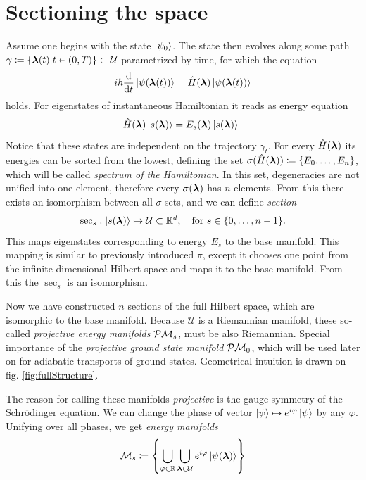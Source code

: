 \section{Sectioning the space}
Assume one begins with the state $\ket{\psi_0}$. The state then evolves along some path $\gamma\coloneqq\{{\bm\lambda}(t)|t\in(0,T)\}\subset \mathcal U$ parametrized by time, for which the \Schrodinger equation
\begin{equation}
    i\hbar \frac{\mathrm{d} }{\mathrm{d} t}\ket{\psi({\bm\lambda}(t))} = \hat{H}({\bm\lambda})\ket{\psi({\bm\lambda}(t))}
    \label{eq:schrodinger}
\end{equation}
holds. For eigenstates of instantaneous Hamiltonian it reads as energy \Schrodinger equation
\begin{equation}
    \hat{H}({\bm\lambda})\ket{s({\bm\lambda})}=E_s({\bm\lambda})\ket{s({\bm\lambda})}.
    \label{eq:energySchrodinger}
\end{equation}
Notice that these states are independent on the trajectory $\gamma_t$.
For every $\hat{H}({\bm\lambda})$ its energies can be sorted from the lowest, defining the set $\sigma(\hat{H}({\bm\lambda}))\coloneqq\{E_0,\dots,E_n\}$, which will be called \emph{spectrum of the Hamiltonian}. In this set, degeneracies are not unified into one element, therefore every $\sigma({\bm\lambda})$ has $n$ elements. From this there exists an isomorphism between all $\sigma$-sets, and we can define \emph{section} 
$$\mathrm{sec}_s: \ket{s({\bm\lambda})}\mapsto \mathcal{U}\subset \mathbb{R}^d, \quad \text{for } s\in\{0,\dots, n-1\}.$$
This maps eigenstates corresponding to energy $E_s$ to the base manifold. This mapping is similar to previously introduced $\pi$, except it chooses one point from the infinite dimensional Hilbert space and maps it to the base manifold. From this the $\sec_s$ is an isomorphism. 

Now we have constructed $n$ sections of the full Hilbert space, which are isomorphic to the base manifold. Because $\mathcal U$ is a Riemannian manifold, these so-called \emph{projective energy manifolds} $\mathcal{P}\mathcal{M}_s$, must be also Riemannian.
Special importance of the \emph{projective ground state manifold} $\mathcal{P}\mathcal{M}_0$, which will be used later on for adiabatic transports of ground states. Geometrical intuition is drawn on fig. \ref{fig:fullStructure}. 

The reason for calling these manifolds \emph{projective} is the gauge symmetry of the Schr\"odinger equation. We can change the phase of vector $\ket{\psi}\mapsto e^{i\varphi}\ket{\psi}$ by any $\varphi$. Unifying over all phases, we get \emph{energy manifolds}
\begin{equation}
    \mathcal{M}_s\coloneqq \left\{\bigcup_{\varphi\in\mathbb{R}} \bigcup_{{\bm\lambda}\in\mathcal U} e^{i\varphi}\ket{\psi({\bm\lambda})}\right\}
\end{equation}

